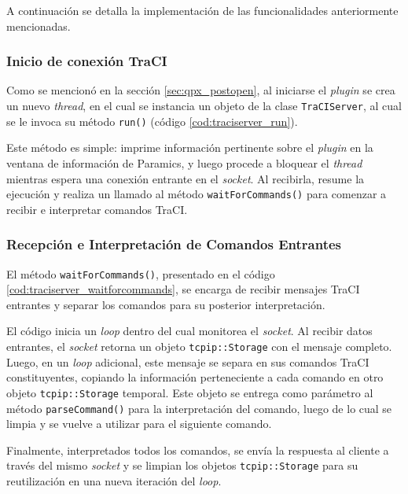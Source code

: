 A continuación se detalla la implementación de las funcionalidades anteriormente mencionadas.

\subsubsection{Inicio de conexión TraCI}

Como se mencionó en la sección \ref{sec:qpx_postopen}, al iniciarse el \emph{plugin} se crea un nuevo \emph{thread}, en el cual se instancia un objeto de la clase \texttt{TraCIServer}, al cual se le invoca su método \texttt{run()} (código \ref{cod:traciserver_run}).



Este método es simple: imprime información pertinente sobre el \emph{plugin} en la ventana de información de Paramics, y luego procede a bloquear el \emph{thread} mientras espera una conexión entrante en el \emph{socket}. Al recibirla, resume la ejecución y realiza un llamado al método \texttt{waitForCommands()} para comenzar a recibir e interpretar comandos TraCI.

\subsubsection{Recepción e Interpretación de Comandos Entrantes}

El método \texttt{waitForCommands()}, presentado en el código \ref{cod:traciserver_waitforcommands}, se encarga de recibir mensajes TraCI entrantes y separar los comandos para su posterior interpretación.

El código inicia un \emph{loop} dentro del cual monitorea el \emph{socket}. Al recibir datos entrantes, el \emph{socket} retorna un objeto \texttt{tcpip::Storage} con el mensaje completo. Luego, en un \emph{loop} adicional, este mensaje se separa en sus comandos TraCI constituyentes, copiando la información perteneciente a cada comando en otro objeto \texttt{tcpip::Storage} temporal. Este objeto se entrega como parámetro al método \texttt{parseCommand()} para la interpretación del comando, luego de lo cual se limpia y se vuelve a utilizar para el siguiente comando.

Finalmente, interpretados todos los comandos, se envía la respuesta al cliente a través del mismo \emph{socket} y se limpian los objetos \texttt{tcpip::Storage} para su reutilización en una nueva iteración del \emph{loop}.

